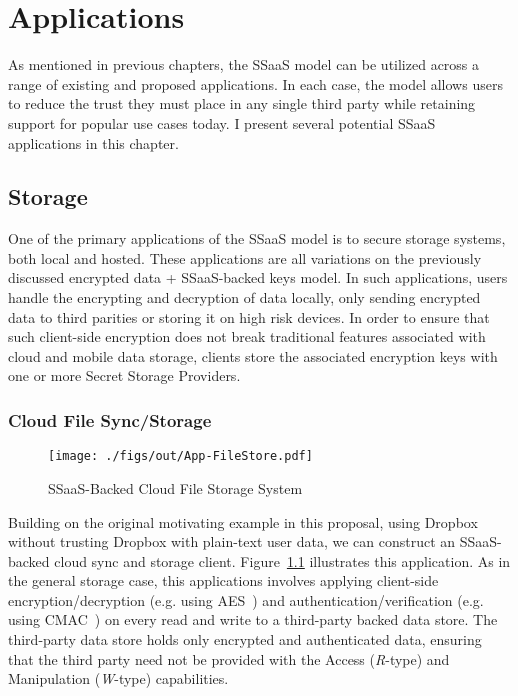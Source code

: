 \chapter{Applications}
\label{chap:apps}

As mentioned in previous chapters, the SSaaS model can be utilized
across a range of existing and proposed applications. In each case,
the model allows users to reduce the trust they must place in any
single third party while retaining support for popular use cases
today. I present several potential SSaaS applications in this chapter.

\section{Storage}

One of the primary applications of the SSaaS model is to secure
storage systems, both local and hosted. These applications are all
variations on the previously discussed encrypted data + SSaaS-backed
keys model. In such applications, users handle the encrypting and
decryption of data locally, only sending encrypted data to third
parities or storing it on high risk devices. In order to ensure that
such client-side encryption does not break traditional features
associated with cloud and mobile data storage, clients store the
associated encryption keys with one or more Secret Storage Providers.

\subsection{Cloud File Sync/Storage}

\begin{figure}[t]
  \centering
  \texttt{[image: ./figs/out/App-FileStore.pdf]}
  \caption{SSaaS-Backed Cloud File Storage System}
  \label{fig:apps-filestore}
\end{figure}

Building on the original motivating example in this proposal, using
Dropbox without trusting Dropbox with plain-text user data, we can
construct an SSaaS-backed cloud sync and storage
client. Figure~\ref{fig:apps-filestore} illustrates this
application. As in the general storage case, this applications
involves applying client-side encryption/decryption (e.g. using
AES~\cite{nist2001}) and authentication/verification (e.g. using
CMAC~\cite{dworkin2005}) on every read and write to a third-party
backed data store. The third-party data store holds only encrypted and
authenticated data, ensuring that the third party need not be provided
with the Access (\emph{R}-type) and Manipulation (\emph{W}-type)
capabilities.


